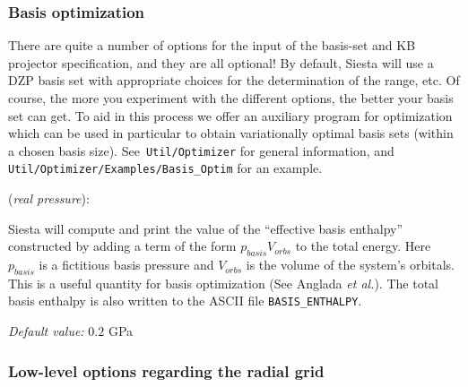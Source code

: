 \documentclass[11pt]{article}
\begin{document}
\subsubsection{Basis optimization}

There are quite a number of options for the input of the basis-set and
KB projector specification, and they are all optional! By default,
{\sc Siesta} will use a DZP basis set with appropriate choices for the
determination of the range, etc. Of course, the more you experiment
with the different options, the better your basis set can get. To aid
in this process we offer an auxiliary program for optimization which
can be used in particular to obtain variationally optimal basis sets
(within a chosen basis size). See {\tt Util/Optimizer}
for general information, and {\tt Util/Optimizer/Examples/Basis\_Optim}
for an example.

\begin{description}
\itemsep 10pt
\parsep 0pt
\item[{\bf BasisPressure}] ({\it real pressure}):

{\sc Siesta} will compute and print the value of the ``effective basis
enthalpy'' constructed by adding a term of the form
$p_{basis}V_{orbs}$ to the total energy. Here $p_{basis}$ is a
fictitious basis pressure and $V_{orbs}$ is the volume of the system's
orbitals. This is a useful quantity for basis optimization (See
Anglada {\it et al.\/}). The total basis enthalpy is also written to
the ASCII file {\tt BASIS\_ENTHALPY}.

{\it Default value:} { $0.2$ GPa}

\end{description}

\subsubsection{Low-level options regarding the radial grid}
\end{document}
